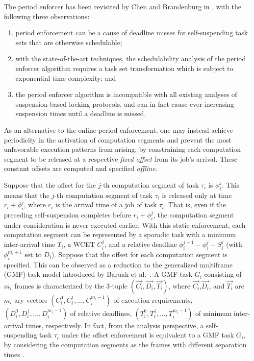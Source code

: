 The period enforcer has been revisited by Chen and Brandenburg in \cite{ChenBrandenburg}, with the following three observations:
\begin{enumerate}
	\item period enforcement can be a cause of deadline misses for self-suspending task sets that are otherwise schedulable;
	\item with the state-of-the-art techniques, the schedulability analysis of the period enforcer algorithm requires a task set 
	transformation which is subject to exponential time complexity; and 	
    \item the period enforcer algorithm is incompatible with all existing analyses of suspension-based locking protocols, 
	and can in fact cause ever-increasing suspension times until a deadline is missed.
\end{enumerate}

\label{sec:static-period-enforce}

As an alternative to the online period enforcement, one may instead achieve periodicity in the activation
of computation segments and prevent the most unfavorable execution patterns from arising, by constraining
each computation segment to be released at a respective \emph{fixed offset} from its job's arrival.
These constant offsets are computed and specified \emph{offline}.
 
Suppose that the offset for the $j$-th computation  segment of task $\tau_i$ is $\phi_i^j$. This means that the 
$j$-th computation segment of task $\tau_i$ is released only at time $r_i+\phi_i^j$, where $r_i$ is the arrival time of a job 
of task $\tau_i$. That is, even if the preceding self-suspension completes before $r_i+\phi_i^j$, the computation segment under 
consideration is never executed earlier. With this static enforcement, each computation segment can be represented by a sporadic 
task with a minimum inter-arrival time $T_i$, a WCET $C_i^j$, and a relative deadline $\phi_{i}^{j+1}-\phi_i^j-S_i^j$ (with 
$\phi_{i}^{m_i+1}$ set to $D_i$).
Suppose that the offset for each computation segment is specified. This can be observed as a reduction to 
the generalized multiframe (GMF) task model introduced by Baruah et al.~\cite{baruah1999generalized}. A GMF task $G_i$ consisting of $m_i$ frames is characterized by the $3$-tuple $(\vec{C_i},\vec{D_i},\vec{T_i})$, where $\vec{C_i}$,$\vec{D_i}$, and $\vec{T_i}$ are $m_i$-ary vectors $(C_{i}^0,C_{i}^1,...,C_{i}^{m_i-1})$ of execution requirements, $(D_{i}^0,D_{i}^1,...,D_{i}^{m_i-1})$ of relative deadlines, $(T_{i}^0,T_{i}^1,...,T_{i}^{m_i-1})$ of minimum inter-arrival times, respectively.
In fact, from the analysis perspective, a self-suspending task $\tau_i$ under the offset enforcement is equivalent to a GMF task $G_i$,  by considering the computation segments as the frames with different separation times \cite{WC16-suspend-DATE,DBLP:journals/ieicet/DingTT09}.

